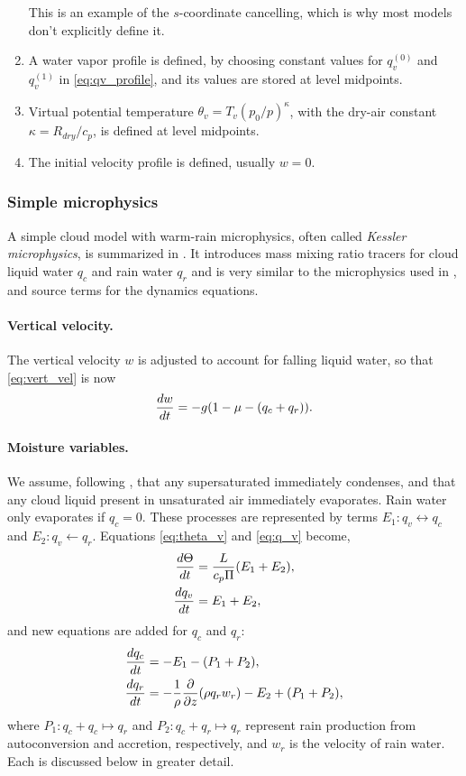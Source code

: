 \begin{enumerate}
    \begin{rem}
    This is an example of the $s$-coordinate cancelling, which is why most models don't explicitly define it.
    \end{rem}
  \item A water vapor profile is defined, by choosing constant values for $q_v^{(0)}$ and $q_v^{(1)}$ in \eqref{eq:qv_profile}, and its values are stored at level midpoints.
  \item Virtual potential temperature $\theta_v = T_v(p_0/p)^{\kappa}$, with the dry-air constant $\kappa = R_{dry}/c_p$, is defined at level midpoints.
  \item The initial velocity profile is defined, usually $w=0$.  
\end{enumerate}


\subsubsection{Simple microphysics}

A simple cloud model with warm-rain microphysics, often called \emph{Kessler microphysics}, is summarized in \cite[ch.~15]{RogersYau}.
It introduces mass mixing ratio tracers for cloud liquid water $q_c$ and rain water $q_r$ and is very similar to the microphysics used in \cite{SoongOgura1973,KlempWilhelmson1978}, and source terms for the dynamics equations.

\paragraph{Vertical velocity.} The vertical velocity $w$ is adjusted to account for falling liquid water, so that \eqref{eq:vert_vel} is now
\begin{equation*}
  \frac{ d w}{d t} = -g(1-\mu -(q_c+q_r)).  
\end{equation*}


\paragraph{Moisture variables.}
We assume, following \cite{SoongOgura1973,KlempWilhelmson1978}, that any supersaturated immediately condenses, and that any cloud liquid present in unsaturated air immediately evaporates.
Rain water only evaporates if $q_c = 0$.
These processes are represented by terms $E_1:q_v\leftrightarrow q_c$ and $E_2:q_v \leftarrow q_r$.
Equations \eqref{eq:theta_v} and \eqref{eq:q_v} become,
\begin{align}
  \frac{ d \Theta}{d t} &= \frac{L}{c_p \Pi }(E_1 + E_2), \\
  \frac{ d q_v}{d t} &= E_1 + E_2,
\end{align}
and new equations are added for $q_c$ and $q_r$:
\begin{align}
  \frac{ d q_c}{d t} &= -E_1 - (P_1 + P_2),\\
  \frac{ d q_r}{d t} &= -\frac{1}{\rho}\frac{\partial  }{\partial z}(\rho q_r w_r) - E_2 + (P_1 + P_2),
\end{align}
where $P_1:q_c+q_c\mapsto q_r$ and $P_2:q_c+q_r\mapsto q_r$ represent rain production from autoconversion and accretion, respectively, and $w_r$ is the velocity of rain water. Each is discussed below in greater detail.

